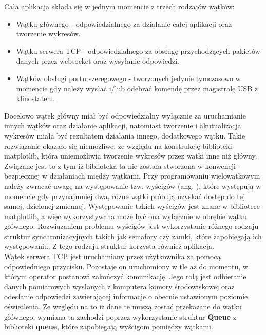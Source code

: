 Cała aplikacja składa się w jednym momencie z trzech rodzajów wątków:
\begin{itemize}
	\item Wątku głównego - odpowiedzialnego za działanie całej aplikacji oraz tworzenie wykresów.
	\item Wątku serwera TCP - odpowiedzialnego za obsługę przychodzących pakietów danych przez websocket oraz wysyłanie odpowiedzi.
	\item Wątków obsługi portu szeregowego - tworzonych jedynie tymczasowo w momencie gdy należy wysłać i/lub odebrać komendę przez magistralę USB z klinostatem.
\end{itemize}
Docelowo wątek główny miał być odpowiedzialny wyłącznie za uruchamianie innych wątków oraz działanie aplikacji, natomiast tworzenie i akutualizacja wykresów miała być rezultatem działania innego, dodatkowego wątku. Takie rozwiązanie okazało się niemożliwe, ze względu na konstrukcję biblioteki matplotlib, która uniemożliwia tworzenie wykresów przez wątki inne niż główny. Związane jest to z tym iż biblioteka ta nie została stworzona w konwencji  - bezpiecznej w działaniach między wątkami. Przy programowaniu wielowątkowym należy zwracać uwagę na występowanie tzw. wyścigów (ang. ), które występują w momencie gdy przynajmniej dwa, różne wątki próbują uzyskać dostęp do tej samej, dzielonej zmiennej. Występowanie takich wyścigów jest znane w bibliotece matplotlib, a więc wykorzystywana może być ona wyłącznie w obrębie wątku głównego. Rozwiązaniem problemu wyścigów jest wykorzystanie różnego rodzaju struktur synchronizacyjnych takich jak semafory czy zamki, które zapobiegają ich występowaniu. Z tego rodzaju struktur korzysta również aplikacja.\\

Wątek serwera TCP jest uruchamiany przez użytkownika za pomocą odpowiedniego przycisku. Pozostaje on uruchomiony w tle aż do momentu, w którym operator postanowi zakończyć komunikację. Jego rolą jest odbieranie danych pomiarowych wysłanych z komputera komory środowiskowej oraz odesłanie odpowiedzi zawierającej informacje o obecnie ustawionym poziomie oświetlenia. Ze względu na to iż dane te muszą zostać przekazane do wątku głównego, wymiana ta zachodzi poprzez wykorzystanie struktur \textbf{Queue} z biblioteki \textbf{queue}, które zapobiegają wyścigom pomiędzy wątkami.\\

